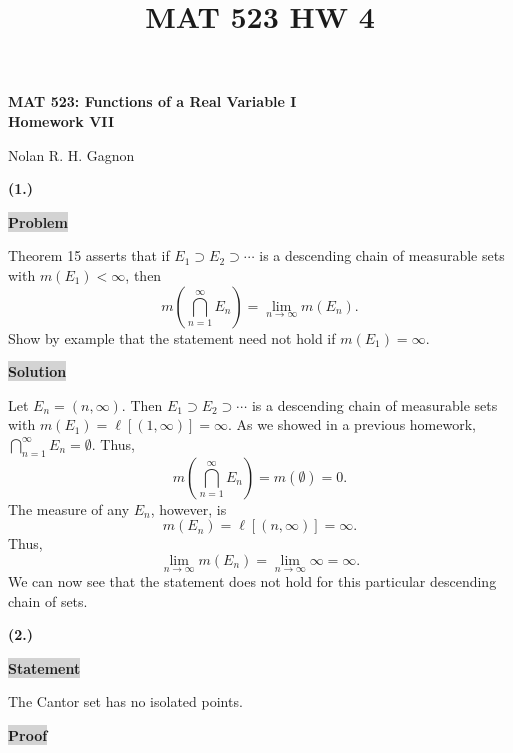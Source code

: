 \documentclass[12pt]{article}
\title{MAT 523 HW 4}
\newcommand{\mybox}{%
    \collectbox{%
        \setlength{\fboxsep}{2pt}%
        \fbox{\BOXCONTENT}%
    }%
}
\begin{document}
\begin{center}
\begin{large}
\textbf{MAT 523: Functions of a Real Variable I \\
Homework VII \\}
\end{large}
Nolan R. H. Gagnon \\
\end{center}

\noindent \textbf{(1.)}

\vspace{3mm}

\noindent\mybox{\colorbox{lightgray}{\textbf{Problem}}}\hspace{3mm}\hrulefill

\noindent Theorem 15 asserts that if $E_1\supset E_2 \supset \cdots $ is a descending chain of measurable sets with $m(E_1) < \infty$, then $$m\left(\bigcap\limits_{n=1}^{\infty}E_n\right)= \lim\limits_{n\rightarrow\infty}m(E_n).$$ Show by example that the statement need not hold if $m(E_1)=\infty.$

\vspace{5mm}

\noindent\mybox{\colorbox{lightgray}{\textbf{Solution}}}\hspace{3mm}\hrulefill

\noindent Let $E_n = (n, \infty).$ Then $E_1\supset E_2\supset \cdots$ is a descending chain of measurable sets with $m(E_1) = \ell[(1,\infty)] = \infty.$ As we showed in a previous homework, $\bigcap\limits_{n=1}^{\infty} E_n = \emptyset.$ Thus, $$m\left(\bigcap\limits_{n=1}^{\infty} E_n\right) = m(\emptyset) = 0.$$ The measure of any $E_n$, however, is $$m(E_n) = \ell[(n,\infty)] = \infty.$$ Thus, $$\lim\limits_{n\rightarrow\infty} m(E_n) = \lim\limits_{n\rightarrow\infty} \infty = \infty.$$ We can now see that the statement does not hold for this particular descending chain of sets.

\pagebreak

\noindent \textbf{(2.)} 

\vspace{3mm}

\noindent\mybox{\colorbox{lightgray}{\textbf{Statement}}}\hspace{3mm}\hrulefill 

\noindent The Cantor set has no isolated points. 

\vspace{5mm}

\noindent\mybox{\colorbox{lightgray}{\textbf{Proof}}}\hspace{3mm}\hrulefill
\end{document}
